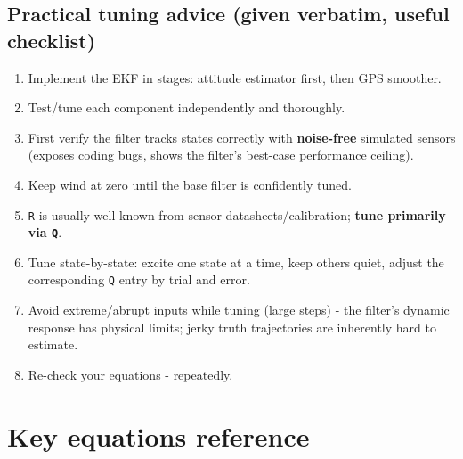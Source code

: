 \documentclass[11pt]{article}
\begin{document}
\subsection{Practical tuning advice (given verbatim, useful checklist)}
\begin{enumerate}
\item Implement the EKF in stages: attitude estimator first, then GPS smoother.
\item Test/tune each component independently and thoroughly.
\item First verify the filter tracks states correctly with \textbf{noise-free} simulated sensors (exposes coding bugs, shows the filter's best-case performance ceiling).
\item Keep wind at zero until the base filter is confidently tuned.
\item \texttt{R} is usually well known from sensor datasheets/calibration; \textbf{tune primarily via \texttt{Q}}.
\item Tune state-by-state: excite one state at a time, keep others quiet, adjust the corresponding \texttt{Q} entry by trial and error.
\item Avoid extreme/abrupt inputs while tuning (large steps) - the filter's dynamic response has physical limits; jerky truth trajectories are inherently hard to estimate.
\item Re-check your equations - repeatedly.
\end{enumerate}

\section{Key equations reference}
\end{document}

